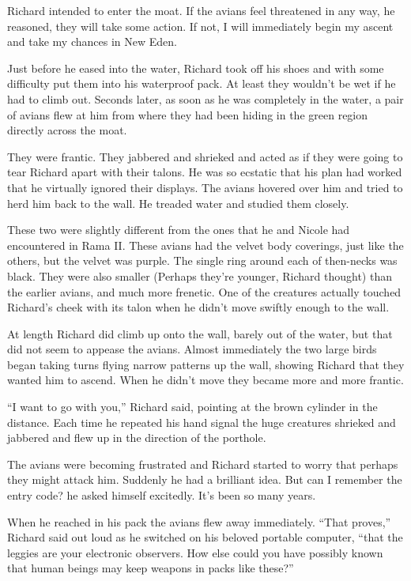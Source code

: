 \documentclass[]{article}
\begin{document}
{Richard intended to enter the moat.  If the avians feel threatened in any way, he reasoned, they will take some action.  If not, I will immediately begin my ascent and take my chances in New Eden.

Just before he eased into the water, Richard took off his shoes and with some difficulty put them into his waterproof pack.  At least they wouldn’t be wet if he had to climb out.  Seconds later, as soon as he was completely in the water, a pair of avians flew at him from where they had been hiding in the green region directly across the moat.

They were frantic.  They jabbered and shrieked and acted as if they were going to tear Richard apart with their talons.  He was so ecstatic that his plan had worked that he virtually ignored their displays.  The avians hovered over him and tried to herd him back to the wall.  He treaded water and studied them closely.

These two were slightly different from the ones that he and Nicole had encountered in Rama II.  These avians had the velvet body coverings, just like the others, but the velvet was purple.  The single ring around each of then-necks was black.  They were also smaller (Perhaps they’re younger, Richard thought) than the earlier avians, and much more frenetic.  One of the creatures actually touched Richard’s cheek with its talon when he didn’t move swiftly enough to the wall.

At length Richard did climb up onto the wall, barely out of the water, but that did not seem to appease the avians.  Almost immediately the two large birds began taking turns flying narrow patterns up the wall, showing Richard that they wanted him to ascend.  When he didn’t move they became more and more frantic.

“I want to go with you,” Richard said, pointing at the brown cylinder in the distance.  Each time he repeated his hand signal the huge creatures shrieked and jabbered and flew up in the direction of the porthole.

The avians were becoming frustrated and Richard started to worry that perhaps they might attack him.  Suddenly he had a brilliant idea.  But can I remember the entry code? he asked himself excitedly.  It’s been so many years.

When he reached in his pack the avians flew away immediately.  “That proves,” Richard said out loud as he switched on his beloved portable computer, “that the leggies are your electronic observers.  How else could you have possibly known that human beings may keep weapons in packs like these?”

}
\end{document}

